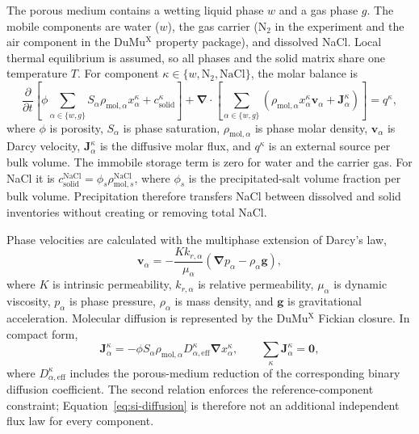 \documentclass[draft,wrr]{agutexSI2019}
\begin{document}
\begin{article}
The porous medium contains a wetting liquid phase $w$ and a gas phase $g$.
The mobile components are water ($w$), the gas carrier ($\mathrm{N_2}$ in the
experiment and the air component in the DuMu$^{\mathrm{X}}$ property package),
and dissolved NaCl. Local thermal equilibrium is assumed, so all phases and the
solid matrix share one temperature $T$. For component
$\kappa\in\{w,\mathrm{N_2},\mathrm{NaCl}\}$, the molar balance is
\begin{equation}
\frac{\partial}{\partial t}
\left[
  \phi\sum_{\alpha\in\{w,g\}}
  S_\alpha\rho_{\mathrm{mol},\alpha}x_\alpha^\kappa
  + c_{\mathrm{solid}}^\kappa
\right]
+\boldsymbol{\nabla}\!\cdot
\left[
  \sum_{\alpha\in\{w,g\}}
  \left(
  \rho_{\mathrm{mol},\alpha}x_\alpha^\kappa\boldsymbol{v}_\alpha
  +\boldsymbol{J}_\alpha^\kappa
  \right)
\right]
=q^\kappa,
\label{eq:si-component-balance}
\end{equation}
where $\phi$ is porosity, $S_\alpha$ is phase saturation,
$\rho_{\mathrm{mol},\alpha}$ is phase molar density,
$\boldsymbol{v}_\alpha$ is Darcy velocity,
$\boldsymbol{J}_\alpha^\kappa$ is the diffusive molar flux, and $q^\kappa$ is
an external source per bulk volume. The immobile storage term is zero for water
and the carrier gas. For NaCl it is
$c_{\mathrm{solid}}^{\mathrm{NaCl}}=
\phi_s\rho_{\mathrm{mol},s}^{\mathrm{NaCl}}$, where $\phi_s$ is the
precipitated-salt volume fraction per bulk volume. Precipitation therefore
transfers NaCl between dissolved and solid inventories without creating or
removing total NaCl.

Phase velocities are calculated with the multiphase extension of Darcy's law,
\begin{equation}
\boldsymbol{v}_\alpha
=-\frac{K k_{r,\alpha}}{\mu_\alpha}
\left(\boldsymbol{\nabla}p_\alpha-\rho_\alpha\boldsymbol{g}\right),
\label{eq:si-darcy}
\end{equation}
where $K$ is intrinsic permeability, $k_{r,\alpha}$ is relative permeability,
$\mu_\alpha$ is dynamic viscosity, $p_\alpha$ is phase pressure,
$\rho_\alpha$ is mass density, and $\boldsymbol{g}$ is gravitational
acceleration. Molecular diffusion is represented by the DuMu$^{\mathrm{X}}$
Fickian closure. In compact form,
\begin{equation}
\boldsymbol{J}_\alpha^\kappa
=-\phi S_\alpha\rho_{\mathrm{mol},\alpha}
D_{\alpha,\mathrm{eff}}^\kappa
\boldsymbol{\nabla}x_\alpha^\kappa,
\qquad
\sum_\kappa\boldsymbol{J}_\alpha^\kappa=\boldsymbol{0},
\label{eq:si-diffusion}
\end{equation}
where $D_{\alpha,\mathrm{eff}}^\kappa$ includes the porous-medium reduction of
the corresponding binary diffusion coefficient. The second relation enforces
the reference-component constraint; Equation~\ref{eq:si-diffusion} is therefore
not an additional independent flux law for every component.


\end{article}
\end{document}
